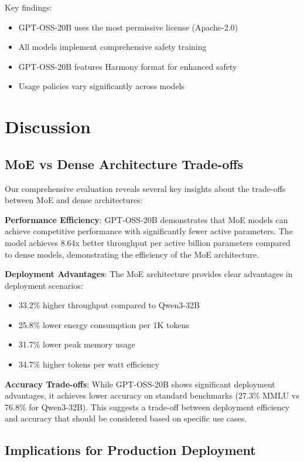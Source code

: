 \documentclass[11pt]{article}
\begin{document}
Key findings:
\begin{itemize}
    \item GPT-OSS-20B uses the most permissive license (Apache-2.0)
    \item All models implement comprehensive safety training
    \item GPT-OSS-20B features Harmony format for enhanced safety
    \item Usage policies vary significantly across models
\end{itemize}

\section{Discussion}

\subsection{MoE vs Dense Architecture Trade-offs}

Our comprehensive evaluation reveals several key insights about the trade-offs between MoE and dense architectures:

\textbf{Performance Efficiency}: GPT-OSS-20B demonstrates that MoE models can achieve competitive performance with significantly fewer active parameters. The model achieves 8.64x better throughput per active billion parameters compared to dense models, demonstrating the efficiency of the MoE architecture.

\textbf{Deployment Advantages}: The MoE architecture provides clear advantages in deployment scenarios:
\begin{itemize}
    \item 33.2\% higher throughput compared to Qwen3-32B
    \item 25.8\% lower energy consumption per 1K tokens
    \item 31.7\% lower peak memory usage
    \item 34.7\% higher tokens per watt efficiency
\end{itemize}

\textbf{Accuracy Trade-offs}: While GPT-OSS-20B shows significant deployment advantages, it achieves lower accuracy on standard benchmarks (27.3\% MMLU vs 76.8\% for Qwen3-32B). This suggests a trade-off between deployment efficiency and accuracy that should be considered based on specific use cases.

\subsection{Implications for Production Deployment}
\end{document}
